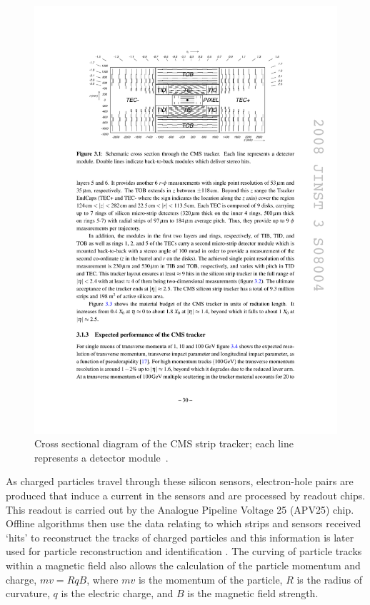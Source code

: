 \begin{figure}[hbtp]
   \centering
     \includegraphics[width=\textwidth]{Chapters/04_Detector/Images/tracker.pdf}\hfill
     \caption[Cross sectional diagram of the CMS strip tracker.]{Cross sectional diagram of the CMS strip
     tracker; each line represents a detector module~\cite{CMS_TDR1}.}
     \label{fig:CMS_strip_tracker}
\end{figure}

As charged particles travel through these silicon sensors, electron-hole pairs are produced that induce a
current in the sensors and are processed by readout chips. This readout is carried out by the Analogue
Pipeline Voltage 25 (APV25) chip. Offline algorithms then use the data relating to which strips and sensors
received `hits' to reconstruct the tracks of charged particles and this information is later used for particle
reconstruction and identification \cite{CMS_experiment,CMS_Tracking_Early_Results}. The curving of particle
tracks within a magnetic field also allows the calculation of the particle momentum and charge, $mv=RqB$,
where $mv$ is the momentum of the particle, $R$ is the radius of curvature, $q$ is the electric charge, and
$B$ is the magnetic field strength.

